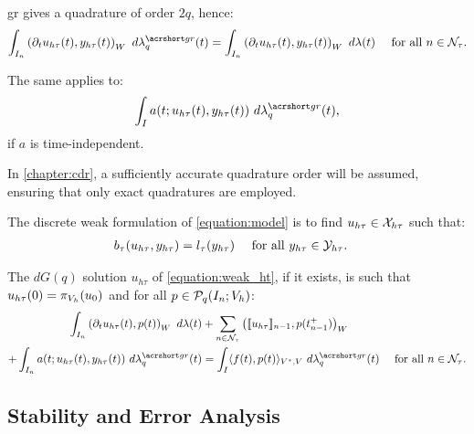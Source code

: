 \begin{remark}
    \acrshort{gr} gives a quadrature of order $2q$, hence:
    \begin{align}
        \int_{I_n} \left( \partial_t u_{h \tau}(t), y_{h \tau}(t) \right)_W ~ d \lambdaGR_q(t) &= \int_{I_n} \left( \partial_t u_{h \tau}(t), y_{h \tau}(t) \right)_W ~ d \lambda(t) &\text{ for all } n \in \TimeIndices.
    \end{align}
    
    The same applies to:
    \begin{align}
        \int_I a(t; u_{h \tau}(t), y_{h \tau}(t)) ~ d \lambdaGR_q(t),
    \end{align}
    if $a$ is time-independent.
\end{remark}
In \cref{chapter:cdr}, a sufficiently accurate quadrature order will be assumed, ensuring that only exact quadratures are employed.

\begin{definition}
    The discrete weak formulation of \cref{equation:model} is to find $u_{h \tau} \in \mathcal{X}_{h \tau}$ such that:
    \begin{align} \label{equation:weak_ht}
        b_{\tau}(u_{h \tau}, y_{h \tau}) &= l_{\tau}(y_{h \tau}) &\text{ for all } y_{h \tau} \in \mathcal{Y}_{h \tau}.
&    \end{align}
\end{definition}

\begin{proposition}[Localization]
    The $dG(q)$ solution $u_{h \tau}$ of \cref{equation:weak_ht}, if it exists, is such that $u_{h \tau}(0) = \pi_{V_h}(u_0)$ and for all $p \in \mathcal{P}_{q}(I_n; V_h)$:
    \begin{align}
        \int_{I_n} \left( \partial_t u_{h \tau}(t), p(t) \right)_W ~ d \lambda(t) & + \sum_{n \in \TimeIndices} \left( \llbracket u_{h \tau} \rrbracket_{n - 1}, p(t_{n - 1}^+) \right)_W \notag \\
        + \int_{I_n} a(t; u_{h \tau}(t), y_{h \tau}(t)) ~ d \lambdaGR_q(t) & = \int_I \langle f(t), p(t) \rangle_{V^*, V} ~ d \lambdaGR_q(t) &\text{ for all } n \in \TimeIndices.
    \end{align}
\end{proposition}

\newpage
\subsection{Stability and Error Analysis}


